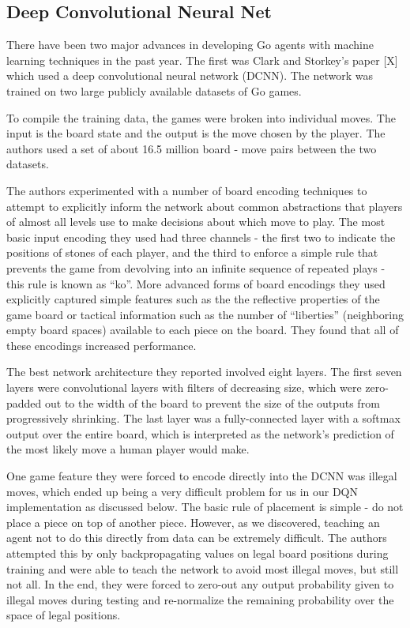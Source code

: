\subsection*{Deep Convolutional Neural Net}
There have been two major advances in developing Go agents with machine learning techniques in the past year. The first was Clark and Storkey's paper [X] which used a deep convolutional neural network (DCNN). The network was trained on two large publicly available datasets of Go games.

To compile the training data, the games were broken into individual moves. The input is the board state and the output is the move chosen by the player. The authors used a set of about 16.5 million board - move pairs between the two datasets.

The authors experimented with a number of board encoding techniques to attempt to explicitly inform the network about common abstractions that players of almost all levels use to make decisions about which move to play. The most basic input encoding they used had three channels - the first two to indicate the positions of stones of each player, and the third to enforce a simple rule that prevents the game from devolving into an infinite sequence of repeated plays - this rule is known as ``ko''. More advanced forms of board encodings they used explicitly captured simple features such as the the reflective properties of the game board or tactical information such as the number of ``liberties'' (neighboring empty board spaces) available to each piece on the board. They found that all of these encodings increased performance.

The best network architecture they reported involved eight layers. The first seven layers were convolutional layers with filters of decreasing size, which were zero-padded out to the width of the board to prevent the size of the outputs from progressively shrinking. The last layer was a fully-connected layer with a softmax output over the entire board, which is interpreted as the network's prediction of the most likely move a human player would make.

One game feature they were forced to encode directly into the DCNN was illegal moves, which ended up being a very difficult problem for us in our DQN implementation as discussed below. The basic rule of placement is simple - do not place a piece on top of another piece. However, as we discovered, teaching an agent not to do this directly from data can be extremely difficult. The authors attempted this by only backpropagating values on legal board positions during training and were able to teach the network to avoid most illegal moves, but still not all. In the end, they were forced to zero-out any output probability given to illegal moves during testing and re-normalize the remaining probability over the space of legal positions.

